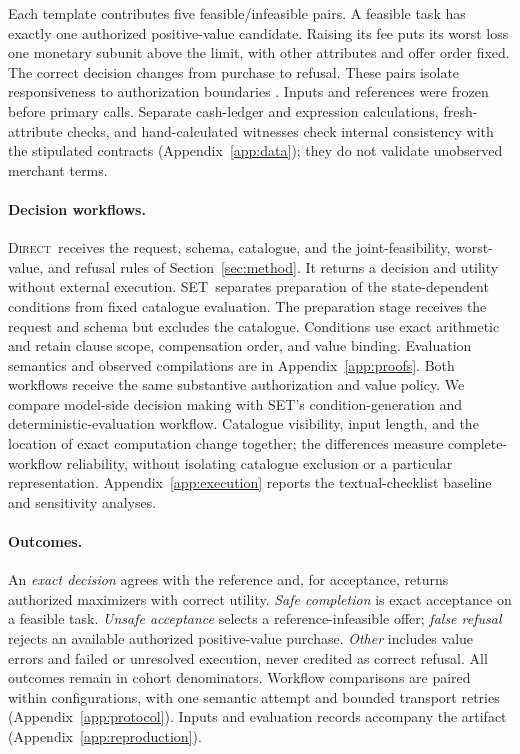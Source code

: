 \documentclass[11pt]{article}
\newcommand{\ours}{\textsc{SET}}
\newcommand{\direct}{\textsc{Direct}}
\begin{document}
Each template contributes five feasible/infeasible pairs. A feasible task has exactly one authorized positive-value candidate. Raising its fee puts its worst loss one monetary subunit above the limit, with other attributes and offer order fixed. The correct decision changes from purchase to refusal. These pairs isolate responsiveness to authorization boundaries \citep{checklist,contrastsets}. Inputs and references were frozen before primary calls. Separate cash-ledger and expression calculations, fresh-attribute checks, and hand-calculated witnesses check internal consistency with the stipulated contracts (Appendix~\ref{app:data}); they do not validate unobserved merchant terms.

\paragraph{Decision workflows.}
\direct\ receives the request, schema, catalogue, and the joint-feasibility, worst-value, and refusal rules of Section~\ref{sec:method}. It returns a decision and utility without external execution. \ours\ separates preparation of the state-dependent conditions from fixed catalogue evaluation. The preparation stage receives the request and schema but excludes the catalogue. Conditions use exact arithmetic and retain clause scope, compensation order, and value binding. Evaluation semantics and observed compilations are in Appendix~\ref{app:proofs}. Both workflows receive the same substantive authorization and value policy. We compare model-side decision making with SET's condition-generation and deterministic-evaluation workflow. Catalogue visibility, input length, and the location of exact computation change together; the differences measure complete-workflow reliability, without isolating catalogue exclusion or a particular representation. Appendix~\ref{app:execution} reports the textual-checklist baseline and sensitivity analyses.

\paragraph{Outcomes.}
An \emph{exact decision} agrees with the reference and, for acceptance, returns authorized maximizers with correct utility. \emph{Safe completion} is exact acceptance on a feasible task. \emph{Unsafe acceptance} selects a reference-infeasible offer; \emph{false refusal} rejects an available authorized positive-value purchase. \emph{Other} includes value errors and failed or unresolved execution, never credited as correct refusal. All outcomes remain in cohort denominators. Workflow comparisons are paired within configurations, with one semantic attempt and bounded transport retries (Appendix~\ref{app:protocol}). Inputs and evaluation records accompany the artifact (Appendix~\ref{app:reproduction}).
\end{document}
